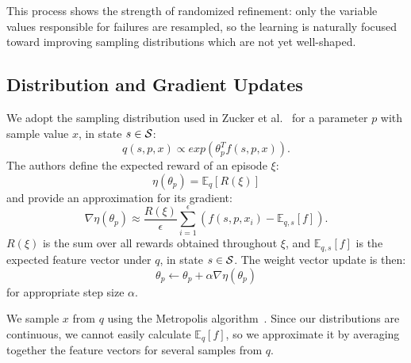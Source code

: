 This process shows the strength of randomized refinement: only the variable
values responsible for failures are resampled, so the learning is naturally
focused toward improving sampling distributions which are not yet well-shaped.

\subsection{Distribution and Gradient Updates}
We adopt the sampling distribution used in Zucker et al.~\cite{workspacebias}
for a parameter $p$ with sample value $x$, in state $s \in \mathcal{S}$:
$$q(s, p, x) \propto exp(\theta_{p}^{T} f(s, p, x)).$$
The authors define the expected reward of an episode $\xi$:
$$\eta(\theta_{p}) = \mathbb{E}_{q}[R(\xi)]$$ and provide an approximation for its gradient:
$$\nabla \eta(\theta_{p}) \approx \frac{R(\xi)}{\epsilon} \sum_{i=1}^{\epsilon}(f(s, p, x_{i}) - \mathbb{E}_{q,s}[f]).$$
$R(\xi)$ is the sum over all rewards obtained throughout $\xi$, and
$\mathbb{E}_{q,s}[f]$ is the expected feature vector under $q$, in state $s \in \mathcal{S}$. The weight vector update is then:
$$\theta_{p} \leftarrow \theta_{p} + \alpha \nabla \eta(\theta_{p})$$
for appropriate step size $\alpha$.

We sample $x$ from $q$ using the Metropolis algorithm~\cite{chib1995understanding}.
Since our distributions are continuous, we cannot easily calculate $\mathbb{E}_{q}[f]$,
so we approximate it by averaging together the feature vectors for several samples from $q$.